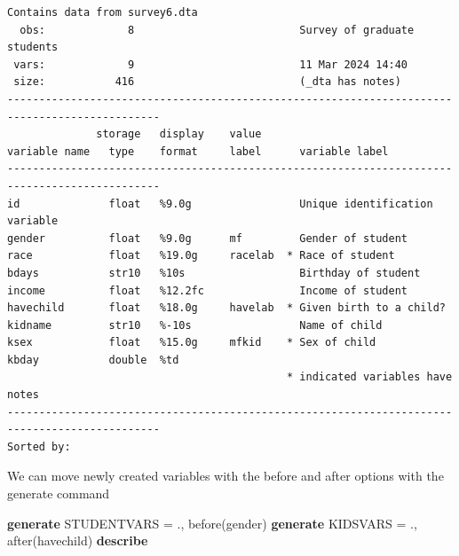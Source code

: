 \documentclass[
]{book}
\newenvironment{Shaded}{\begin{snugshade}}{\end{snugshade}}
\newcommand{\KeywordTok}[1]{\textcolor[rgb]{0.13,0.29,0.53}{\textbf{#1}}}
\newcommand{\NormalTok}[1]{#1}
\begin{document}
\begin{verbatim}
Contains data from survey6.dta
  obs:             8                          Survey of graduate students
 vars:             9                          11 Mar 2024 14:40
 size:           416                          (_dta has notes)
----------------------------------------------------------------------------------------------
              storage   display    value
variable name   type    format     label      variable label
----------------------------------------------------------------------------------------------
id              float   %9.0g                 Unique identification variable
gender          float   %9.0g      mf         Gender of student
race            float   %19.0g     racelab  * Race of student
bdays           str10   %10s                  Birthday of student
income          float   %12.2fc               Income of student
havechild       float   %18.0g     havelab  * Given birth to a child?
kidname         str10   %-10s                 Name of child
ksex            float   %15.0g     mfkid    * Sex of child
kbday           double  %td                   
                                            * indicated variables have notes
----------------------------------------------------------------------------------------------
Sorted by: 
\end{verbatim}

We can move newly created variables with the before and after options with the generate command

\begin{Shaded}
\begin{Highlighting}[]
\KeywordTok{generate}\NormalTok{ STUDENTVARS = ., before(gender)}
\KeywordTok{generate}\NormalTok{ KIDSVARS = ., after(havechild)}
\KeywordTok{describe}
\end{Highlighting}
\end{Shaded}
\end{document}
